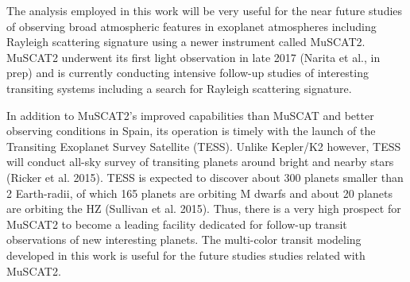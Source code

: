 
 
The analysis employed in this work will be very useful for the near future studies of observing broad atmospheric features in exoplanet atmospheres  including Rayleigh scattering signature using a newer instrument called MuSCAT2. MuSCAT2 underwent its first light observation in late 2017 (Narita et al., in prep) and is currently conducting intensive follow-up studies of interesting transiting systems including a search for Rayleigh scattering signature. 

In addition to MuSCAT2’s improved capabilities than MuSCAT and better observing conditions in Spain, its operation is timely with the launch of the Transiting Exoplanet Survey Satellite (TESS). Unlike Kepler/K2 however, TESS will conduct all-sky survey of transiting planets around bright and nearby stars (Ricker et al. 2015). TESS is expected to discover about 300 planets smaller than 2 Earth-radii, of which 165 planets are orbiting M dwarfs and about 20 planets are orbiting the HZ (Sullivan et al. 2015). Thus,  there is a very high prospect for MuSCAT2 to become a leading facility dedicated for follow-up transit observations of new interesting planets. The multi-color transit modeling developed in this work is useful for the future studies studies related with MuSCAT2.